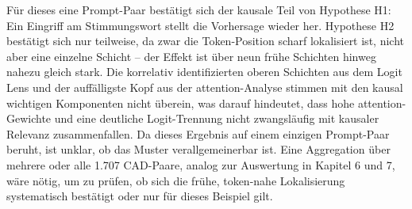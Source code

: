Für dieses eine Prompt-Paar bestätigt sich der kausale Teil von Hypothese H1: Ein Eingriff am Stimmungswort stellt die Vorhersage wieder her. Hypothese H2 bestätigt sich nur teilweise, da zwar die Token-Position scharf lokalisiert ist, nicht aber eine einzelne Schicht -- der Effekt ist über neun frühe Schichten hinweg nahezu gleich stark. Die korrelativ identifizierten oberen Schichten aus dem Logit Lens und der auffälligste Kopf aus der \gls{attention}-Analyse stimmen mit den kausal wichtigen Komponenten nicht überein, was darauf hindeutet, dass hohe \gls{attention}-Gewichte und eine deutliche Logit-Trennung nicht zwangsläufig mit kausaler Relevanz zusammenfallen. Da dieses Ergebnis auf einem einzigen Prompt-Paar beruht, ist unklar, ob das Muster verallgemeinerbar ist. Eine Aggregation über mehrere oder alle 1.707 CAD-Paare, analog zur Auswertung in Kapitel 6 und 7, wäre nötig, um zu prüfen, ob sich die frühe, token-nahe Lokalisierung systematisch bestätigt oder nur für dieses Beispiel gilt.
